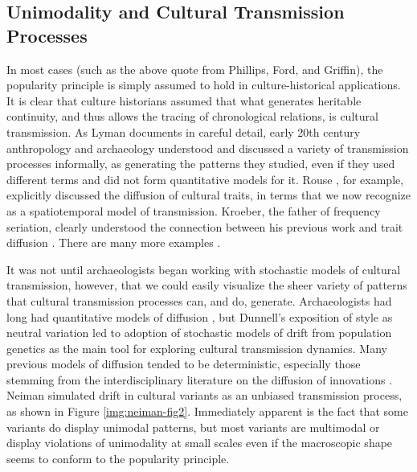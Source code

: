 \documentclass[graybox,natbib]{svmult}
\begin{document}
\subsection{Unimodality and Cultural Transmission
Processes}\label{unimodality-and-cultural-transmission-processes}

In most cases (such as the above quote from Phillips, Ford, and
Griffin), the popularity principle is simply assumed to hold in
culture-historical applications. It is clear that culture historians
assumed that what generates heritable continuity, and thus allows the
tracing of chronological relations, is cultural transmission. As Lyman
\citeyearpar{Lyman2008} documents in careful detail, early 20th century
anthropology and archaeology understood and discussed a variety of
transmission processes informally, as generating the patterns they
studied, even if they used different terms and did not form quantitative
models for it. Rouse \citeyearpar{Rouse1939}, for example, explicitly
discussed the diffusion of cultural traits, in terms that we now
recognize as a spatiotemporal model of transmission. Kroeber, the father
of frequency seriation, clearly understood the connection between his
previous work and trait diffusion \citep{kroeber1937diffusion}. There
are many more examples \citep{Lyman2008}.

It was not until archaeologists began working with stochastic models of
cultural transmission, however, that we could easily visualize the sheer
variety of patterns that cultural transmission processes can, and do,
generate. Archaeologists had long had quantitative models of diffusion
\citep[e.g.,][]{ammerman1971measuring}, but Dunnell's
\citeyearpar{Dunnell1978} exposition of style as neutral variation led
to adoption of stochastic models of drift from population genetics as
the main tool for exploring cultural transmission dynamics. Many
previous models of diffusion tended to be deterministic, especially
those stemming from the interdisciplinary literature on the diffusion of
innovations \citep[e.g.,][]{Rogers2003}. Neiman \citeyearpar{Neiman1995}
simulated drift in cultural variants as an unbiased transmission
process, as shown in Figure \ref{img:neiman-fig2}. Immediately apparent
is the fact that some variants do display unimodal patterns, but most
variants are multimodal or display violations of unimodality at small
scales even if the macroscopic shape seems to conform to the popularity
principle.
\end{document}
